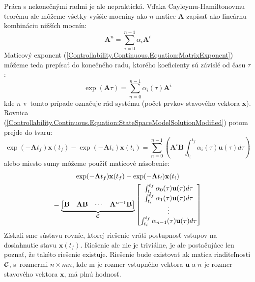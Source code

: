 \documentclass[a4paper, 10pt, ]{article}
\begin{document}
Práca s nekonečnými radmi je ale nepraktická. Vďaka Cayleymu-Hamiltonovmu teorému ale môžeme všetky vyššie mocniny ako $n$ matice $\bm{A}$ zapísať ako lineárnu kombináciu nižších mocnín:
\begin{equation}
    \bm{A}^{n} = \sum_{i = 0}^{n - 1} \alpha_{i} \bm{A}^{i}
\end{equation}
Maticový exponent (\ref{Controllability.Continuous.Equation:MatrixExponent}) môžeme teda prepísať do konečného radu, ktorého koeficienty sú závislé od času $\tau$:
\begin{equation}
    \exp(\bm{A} \tau) = \sum_{n = 0}^{n - 1} \alpha_i(\tau) \bm{A}^{i}
\end{equation}
kde $n$ v~tomto prípade označuje rád systému (počet prvkov stavového vektora $\bm{x}$). Rovnica (\ref{Controllability.Continuous.Equation:StateSpaceModelSolutionModified}) potom prejde do tvaru:
\begin{equation}
    \exp(-\bm{A} t_f) \bm{x}(t_f) - \exp(-\bm{A} t_i) \bm{x}(t_i) = \sum_{n = 0}^{n - 1} \left( \bm{A}^{i} \bm{B} \int_{t_i}^{t_f} \alpha_i(\tau) \bm{u}(\tau) d\tau \right)
\end{equation}
alebo miesto sumy môžeme použiť maticové násobenie:
\begin{multline}
    \exp(-\mathbf{A} t_f) \mathbf{x}(t_f) - \exp(-\mathbf{A} t_i) \mathbf{x}(t_i) \\ = 
    \underbrace{
        \begin{bmatrix}
            \mathbf{B} & \mathbf{A}\mathbf{B} & \cdots & \mathbf{A}^{n - 1} \mathbf{B}
        \end{bmatrix}
    }_{\boldsymbol{\mathcal{C}}}
    \begin{bmatrix}
        \int_{t_i}^{t_f} \alpha_0(\tau) \mathbf{u}(\tau) d\tau       \\
        \int_{t_i}^{t_f} \alpha_1(\tau) \mathbf{u}(\tau) d\tau       \\
        \vdots                                                 \\
        \int_{t_i}^{t_f} \alpha_{n - 1}(\tau) \mathbf{u}(\tau) d\tau \\
    \end{bmatrix}
\end{multline}
Získali sme sústavu rovníc, ktorej riešenie vráti postupnosť vstupov na dosiahnutie stavu $\bm{x}(t_f)$. Riešenie ale nie je triviálne, je ale postačujúce len poznať, že takéto riešenie existuje. Riešenie bude existovať ak matica riaditeľnosti $\boldsymbol{\mathcal{C}}$, s~rozmermi $n \times mn$, kde m je rozmer vstupného vektora $\bm{u}$ a $n$ je rozmer stavového vektora $\bm{x}$, má plnú hodnosť.
\end{document}
